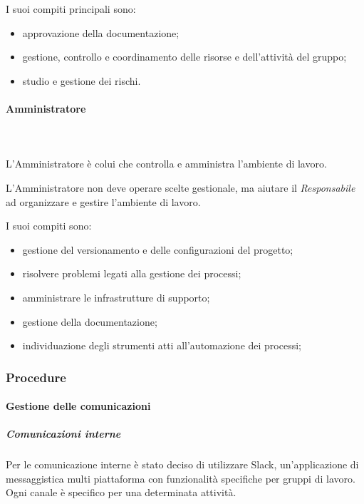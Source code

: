    			I suoi compiti principali sono:
   			\begin{itemize}
   				\item approvazione della documentazione;
   				\item gestione, controllo e coordinamento delle risorse e dell'attività del gruppo;
   				\item studio e gestione dei rischi.
   			\end{itemize}
   			\paragraph{Amministratore} \mbox{}\\ \mbox{}\\
   			L'Amministratore è colui che controlla e amministra l'ambiente di lavoro.

   			L'Amministratore non deve operare scelte gestionale, ma aiutare il \textit{Responsabile} ad organizzare e gestire l'ambiente di lavoro.

   			I suoi compiti sono:
   			\begin{itemize}
   				\item gestione del versionamento e delle configurazioni del progetto;
   				\item risolvere problemi legati alla gestione dei processi;
   				\item amministrare le infrastrutture di supporto;
   				\item gestione della documentazione;
   				\item individuazione degli strumenti atti all'automazione dei processi;
   			\end{itemize}
   		\subsubsection{Procedure}
   			\paragraph{Gestione delle comunicazioni}
   				\subparagraph{Comunicazioni interne}
   					Per le comunicazione interne è stato deciso di utilizzare  Slack\glos, un'applicazione di messaggistica multi piattaforma con funzionalità specifiche per gruppi di lavoro. Ogni canale è specifico per una determinata attività.

